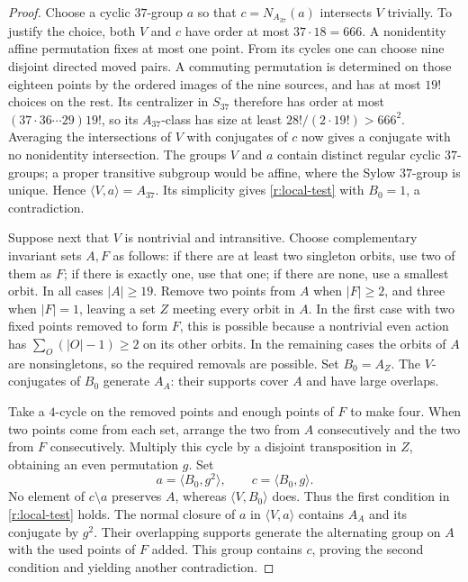 \begin{proof}
Choose a cyclic $37$-group $a$ so that
$c=N_{A_{37}}(a)$ intersects $V$ trivially.  To justify the choice, both
$V$ and $c$ have order at most $37\cdot18=666$.  A nonidentity affine
permutation fixes at most one point.  From its cycles one can choose
nine disjoint directed moved pairs.  A commuting permutation is
determined on those eighteen points by the ordered images of the nine
sources, and has at most $19!$ choices on the rest.  Its centralizer
in $S_{37}$ therefore has order at most
$(37\cdot36\cdots29)19!$, so its $A_{37}$-class has size at least
$28!/(2\cdot19!)>666^2$.  Averaging the intersections of $V$ with
conjugates of $c$ now gives a conjugate with no nonidentity intersection.
The groups $V$ and $a$ contain distinct regular cyclic $37$-groups;
a proper transitive subgroup would be affine, where the Sylow
$37$-group is unique.  Hence $\langle V,a\rangle=A_{37}$.
Its simplicity gives \eqref{r:local-test} with $B_0=1$, a contradiction.

Suppose next that $V$ is nontrivial and intransitive.  Choose
complementary invariant sets $A,F$ as follows: if there are at least two
singleton orbits, use two of them as $F$; if there is exactly one, use
that one; if there are none, use a smallest orbit.  In all cases
$|A|\ge19$.  Remove two points from $A$ when $|F|\ge2$, and three
when $|F|=1$, leaving a set $Z$ meeting every orbit in $A$.  In the
first case with two fixed points removed to form $F$, this is possible
because a nontrivial even action has
$\sum_O(|O|-1)\ge2$ on its other orbits.  In the remaining cases the
orbits of $A$ are nonsingletons, so the required removals are possible.
Set $B_0=A_Z$.  The $V$-conjugates of $B_0$ generate $A_A$:
their supports cover $A$ and have large overlaps.

Take a $4$-cycle on the removed points and enough points of $F$ to
make four.  When two points come from each set, arrange the two from
$A$ consecutively and the two from $F$ consecutively.  Multiply this
cycle by a disjoint transposition in $Z$, obtaining an even permutation
$g$.  Set
\[
 a=\langle B_0,g^2\rangle,\qquad c=\langle B_0,g\rangle.
\]
No element of $c\setminus a$ preserves $A$, whereas
$\langle V,B_0\rangle$ does.  Thus the first condition in
\eqref{r:local-test} holds.  The normal closure of $a$ in
$\langle V,a\rangle$ contains $A_A$ and its conjugate by $g^2$.
Their overlapping supports generate the alternating group on $A$
with the used points of $F$ added.  This group contains $c$, proving
the second condition and yielding another contradiction.


\end{proof}
